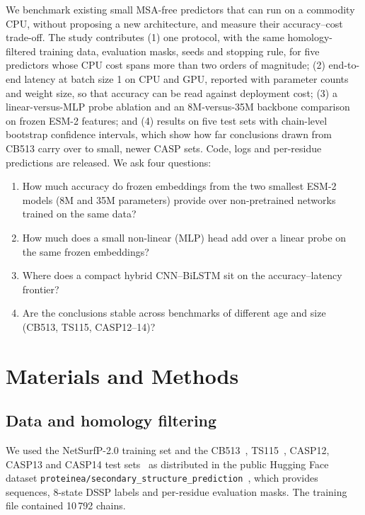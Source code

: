 \documentclass[preprint,12pt,authoryear]{elsarticle}
\begin{document}
We benchmark existing small MSA-free predictors that can run on a commodity CPU, without proposing a new architecture, and measure their accuracy--cost trade-off. The study contributes (1) one protocol, with the same homology-filtered training data, evaluation masks, seeds and stopping rule, for five predictors whose CPU cost spans more than two orders of magnitude; (2) end-to-end latency at batch size 1 on CPU and GPU, reported with parameter counts and weight size, so that accuracy can be read against deployment cost; (3) a linear-versus-MLP probe ablation and an 8M-versus-35M backbone comparison on frozen ESM-2 features; and (4) results on five test sets with chain-level bootstrap confidence intervals, which show how far conclusions drawn from CB513 carry over to small, newer CASP sets. Code, logs and per-residue predictions are released. We ask four questions:
\begin{enumerate}
    \item How much accuracy do frozen embeddings from the two smallest ESM-2 models (8M and 35M parameters) provide over non-pretrained networks trained on the same data?
    \item How much does a small non-linear (MLP) head add over a linear probe on the same frozen embeddings?
    \item Where does a compact hybrid CNN--BiLSTM sit on the accuracy--latency frontier?
    \item Are the conclusions stable across benchmarks of different age and size (CB513, TS115, CASP12--14)?
\end{enumerate}

\section{Materials and Methods}
\label{sec:methods}

\subsection{Data and homology filtering}
We used the NetSurfP-2.0 training set and the CB513~\citep{cuff1999evaluation}, TS115~\citep{yang2018sixty}, CASP12, CASP13 and CASP14 test sets~\citep{moult2018critical,kryshtafovych2021critical} as distributed in the public Hugging Face dataset \nolinkurl{proteinea/secondary_structure_prediction}~\citep{proteinea2023dataset}, which provides sequences, 8-state DSSP labels and per-residue evaluation masks. The training file contained 10\,792 chains.
\end{document}
